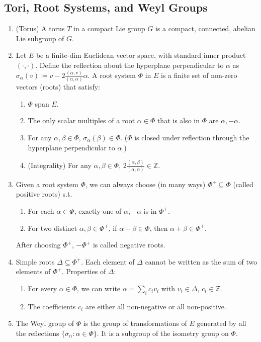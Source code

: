 \subsection{Tori, Root Systems, and Weyl Groups}
\begin{enumerate}
    \item (Torus) A torus $T$ in a compact Lie group $G$ is a compact, connected, abelian Lie subgroup of $G$.
    \item Let $E$ be a finite-dim Euclidean vector space, with standard inner product $(\cdot,\cdot)$. Define the reflection about the hyperplane perpendicular to $\alpha$ as $\sigma_\alpha(v) \coloneqq v - 2\frac{(\alpha,v)}{(\alpha,\alpha)}\alpha$. A root system $\Phi$ in $E$ is a finite set of non-zero vectors (roots) that satisfy:
        \begin{enumerate}
            \item $\Phi$ span $E$.
            \item The only scalar multiples of a root $\alpha\in \Phi$ that is also in $\Phi$ are $\alpha, -\alpha$.
            \item For any $\alpha,\beta\in \Phi$, $\sigma_\alpha(\beta) \in \Phi$. ($\Phi$ is closed under reflection through the hyperplane perpendicular to $\alpha$.)
            \item (Integrality) For any $\alpha,\beta\in \Phi$, $2 \frac{(\alpha,\beta)}{(\alpha,\alpha)} \in \mathbb{Z}$.
        \end{enumerate}
    \item Given a root system $\Phi$, we can always choose (in many ways) $\Phi^+ \subseteq \Phi$ (called positive roots) s.t. 
        \begin{enumerate}
            \item For each $\alpha \in \Phi$, exactly one of $\alpha,-\alpha$ is in $\Phi^+$.
            \item For two distinct $\alpha,\beta \in \Phi^+$, if $\alpha+\beta \in \Phi$, then $\alpha+\beta \in \Phi^+$.
        \end{enumerate}
        After choosing $\Phi^+$, $-\Phi^+$ is called negative roots.
    \item Simple roots $\Delta \subseteq \Phi^+$. Each element of $\Delta$ cannot be written as the sum of two elements of $\Phi^+$. Properties of $\Delta$:
        \begin{enumerate}
            \item For every $\alpha \in \Phi$, we can write $\alpha=\sum_i c_i v_i$ with $v_i \in \Delta$, $c_i \in \mathbb{Z}$.
            \item The coefficients $c_i$ are either all non-negative or all non-positive.
        \end{enumerate}
    \item The Weyl group of $\Phi$ is the group of transformations of $E$ generated by all the reflections $\{\sigma_\alpha: \alpha \in \Phi\}$. It is a subgroup of the isometry group on $\Phi$.
    

\end{enumerate}
